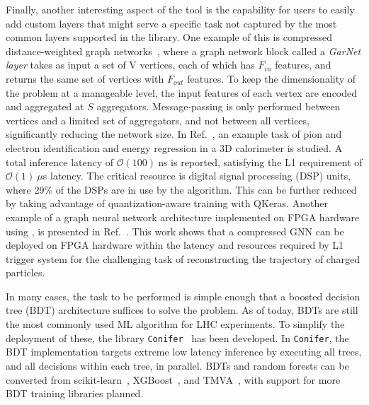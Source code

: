 Finally, another interesting aspect of the \hlsfml tool is the capability for users to easily add custom layers that might serve a specific task not captured by the most common layers supported in the library. One example of this is compressed distance-weighted graph networks~\cite{garnet}, where a graph network block called a \emph{GarNet layer} takes as input a set of V vertices, each of which has $F_{in}$ features, and returns the same set of vertices with $F_{out}$ features. 
To keep the dimensionality of the problem at a manageable level, the input features of each vertex are encoded and aggregated at $S$ aggregators. Message-passing is only performed between vertices and a limited set of aggregators, and not between all vertices, significantly reducing the network size. 
In Ref.~\cite{garnet}, an example task of pion and electron identification and energy regression in a 3D calorimeter is studied. 
A total inference latency of $\mathcal{O}(100)~$ns is reported, satisfying the L1 requirement of $\mathcal{O}(1)~\mu$s latency. 
The critical resource is digital signal processing (DSP) units, where 29\% of the DSPs are in use by the algorithm. 
This can be further reduced by taking advantage of quantization-aware training with QKeras. 
Another example of a graph neural network architecture implemented on FPGA hardware using \hlsfml, is presented in Ref.~\cite{heintz2020accelerated}. 
This work shows that a compressed GNN can be deployed on FPGA hardware within the latency and resources required by L1 trigger system for the challenging task of reconstructing the trajectory of charged particles.

In many cases, the task to be performed is simple enough that a boosted decision tree (BDT) architecture suffices to solve the problem. 
As of today, BDTs are still the most commonly used ML algorithm for LHC experiments. 
To simplify the deployment of these, the library {\tt Conifer}~\cite{Summers:2020xiy} has been developed. In {\tt Conifer}, the BDT implementation targets extreme low latency inference by executing all trees, and all decisions within each tree, in parallel. 
BDTs and random forests can be converted from scikit-learn~\cite{scikit-learn}, XGBoost~\cite{XGBoost}, and TMVA~\cite{TMVA}, with support for more BDT training libraries planned.

